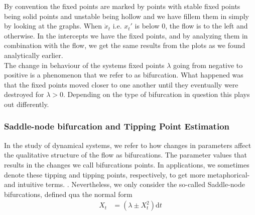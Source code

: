 By convention the fixed points are marked by points with stable fixed points being solid points and unstable being hollow and we have fillem them in simply by looking at the graphs. When $\dot{x}_t$ i.e. $x_t'$ is below 0, the flow is to the left and otherwise. In the intercepts we have the fixed points, and by analyzing them in combination with the flow, we get the same results from the plots as we found analytically earlier. \\
The change in behaviour of the systems fixed points $\lambda$ going from negative to positive is a phenomenon that we refer to as bifurcation. What happened was that the fixed points moved closer to one another until they eventually were destroyed for $\lambda > 0$. Depending on the type of bifurcation in question this plays out differently. 
\subsubsection{Saddle-node bifurcation and Tipping Point Estimation}
In the study of dynamical systems, we refer to how changes in parameters affect the qualitative structure of the flow as bifurcations. The parameter values that results in the changes we call bifurcations points. In applications, we sometimes denote these tipping and tipping points, respectively, to get more metaphorical- and intuitive terms. \cite{Strogatz2019_gv}. Nevertheless, we only consider the so-called Saddle-node bifurcations, defined qua the normal form
\begin{align}
    X_t &= \left(\lambda \pm X_t^2\right) \mathrm{d}t \label{standardForm}
\end{align}

